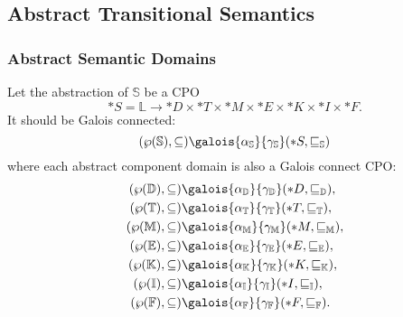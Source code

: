 \documentclass[a4paper]{article}
\newcommand*{\power}[1]{\wp(#1)}
\newcommand*{\dom}[1]{\mathbb{#1}}
\newcommand*{\Abstract}[1]{\alpha_{\dom{#1}}}
\newcommand*{\Concrete}[1]{\gamma_{\dom{#1}}}
\begin{document}
\subsection{Abstract Transitional Semantics}
\subsubsection{Abstract Semantic Domains}
Let the abstraction of $\dom S$ be a CPO \[\dom*S = \dom L \to \dom*D \times \dom*T \times \dom*M \times \dom*E \times \dom*K \times \dom*I \times \dom*F.\]
It should be Galois connected: \[(\power{\dom S}, \subseteq) \galois{\Abstract S}{\Concrete S} (\dom*S, \sqsubseteq_{\dom S})\] where each abstract component domain is also a Galois connect CPO:
\begin{align*}
  (\power{\dom D}, \subseteq) &\galois{\Abstract D}{\Concrete D} (\dom*D, \sqsubseteq_{\dom D}),\\
  (\power{\dom T}, \subseteq) &\galois{\Abstract T}{\Concrete T} (\dom*T, \sqsubseteq_{\dom T}),\\
  (\power{\dom M}, \subseteq) &\galois{\Abstract M}{\Concrete M} (\dom*M, \sqsubseteq_{\dom M}),\\
  (\power{\dom E}, \subseteq) &\galois{\Abstract E}{\Concrete E} (\dom*E, \sqsubseteq_{\dom E}),\\
  (\power{\dom K}, \subseteq) &\galois{\Abstract K}{\Concrete K} (\dom*K, \sqsubseteq_{\dom K}),\\
  (\power{\dom I}, \subseteq) &\galois{\Abstract I}{\Concrete I} (\dom*I, \sqsubseteq_{\dom I}),\\
  (\power{\dom F}, \subseteq) &\galois{\Abstract F}{\Concrete F} (\dom*F, \sqsubseteq_{\dom F}).
\end{align*}
\end{document}
